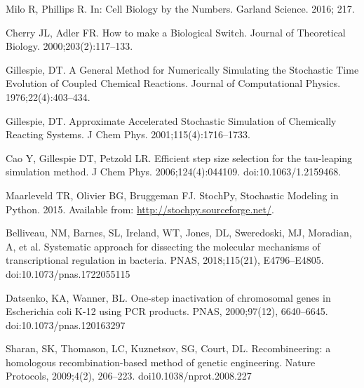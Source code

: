 \documentclass[10pt,letterpaper]{article}
\begin{document}
\begin{thebibliography}{10}
		Milo R, Phillips R.
		\newblock In: Cell Biology by the Numbers. Garland Science. 2016; 217.
		
		Cherry JL, Adler FR.
		\newblock How to make a Biological Switch.
		\newblock Journal of Theoretical Biology. 2000;203(2):117--133.

		Gillespie, DT.
		\newblock A General Method for Numerically Simulating the Stochastic
		Time Evolution of Coupled Chemical Reactions.
		\newblock Journal of Computational Physics. 1976;22(4):403--434.

		Gillespie, DT.
		\newblock Approximate Accelerated Stochastic Simulation
		of Chemically Reacting Systems.
		\newblock J Chem Phys. 2001;115(4):1716--1733.

		Cao Y, Gillespie DT, Petzold LR.
		\newblock Efficient step size selection for the tau-leaping simulation method.
		\newblock J Chem Phys. 2006;124(4):044109.
		\newblock doi:{10.1063/1.2159468}.
		
		Maarleveld TR, Olivier BG, Bruggeman FJ. StochPy, Stochastic Modeling in
		Python. 2015.
		\newblock Available from: \url{http://stochpy.sourceforge.net/}.

		Belliveau, NM, Barnes, SL, Ireland, WT,
		Jones, DL, Sweredoski, MJ, Moradian, A, et al.
		\newblock Systematic approach for dissecting the molecular
		mechanisms of transcriptional regulation in bacteria.
		\newblock PNAS, 2018;115(21), E4796–E4805.
		\newblock doi:{10.1073/pnas.1722055115}

		Datsenko, KA, Wanner, BL.
		\newblock One-step inactivation of chromosomal genes
		in Escherichia coli K-12 using PCR products.
		\newblock PNAS, 2000;97(12), 6640–6645.
		\newblock doi:{10.1073/pnas.120163297}

		Sharan, SK, Thomason, LC, Kuznetsov, SG, Court, DL.
		\newblock Recombineering: a homologous recombination-based
		method of genetic engineering.
		\newblock Nature Protocols, 2009;4(2), 206–223.
		\newblock doi{10.1038/nprot.2008.227}
		
	\end{thebibliography}
	
\end{document}
